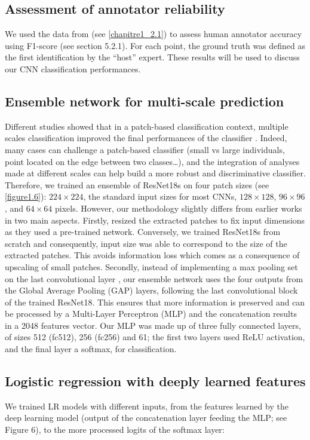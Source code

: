 \subsection{Assessment of annotator reliability}\label{chapitre1_4.1}
We used the data from \citet{beijbom_towards_2015} (see \autoref{chapitre1_2.1}) to assess human annotator accuracy using F1-score (see section 5.2.1). For each point, the ground truth was defined as the first identification by the “host” expert. These results will be used to discuss our CNN classification performances.

\subsection{Ensemble network for multi-scale prediction}\label{chapitre1_4.2}
Different studies showed that in a patch-based classification context, multiple scales classification improved the final performances of the classifier \citep{beijbom_automated_2012, mahmood_coral_2016}. Indeed, many cases can challenge a patch-based classifier (small vs large individuals, point located on the edge between two classes…), and the integration of analyses made at different scales can help build a more robust and discriminative classifier. Therefore, we trained an ensemble of ResNet18s on four patch sizes (see \autoref{figure1.6}): \(224 \times 224\), the standard input sizes for most CNNs, \(128 \times 128\), \(96 \times 96\), and \(64 \times 64\) pixels. However, our methodology slightly differs from earlier works in two main aspects. Firstly, \citet{mahmood_coral_2016} resized the extracted patches to fix input dimensions as they used a pre-trained network. Conversely, we trained ResNet18s from scratch and consequently, input size was able to correspond to the size of the extracted patches. This avoids information loss which comes as a consequence of upscaling of small patches. Secondly, instead of implementing a max pooling set on the last convolutional layer \citep{mahmood_coral_2016}, our ensemble network uses the four outputs from the Global Average Pooling (GAP) layers, following the last convolutional block of the trained ResNet18. This ensures that more information is preserved and can be processed by a Multi-Layer Perceptron (MLP) and the concatenation results in a 2048 features vector. Our MLP was made up of three fully connected layers, of sizes 512 (fc512), 256 (fc256) and 61; the first two layers used ReLU activation, and the final layer a softmax, for classification.


\subsection{Logistic regression with deeply learned features}\label{chapitre1_4.3}
We trained LR models with different inputs, from the features learned by the deep learning model (output of the concatenation layer feeding the MLP; see Figure 6), to the more processed logits of the softmax layer:

